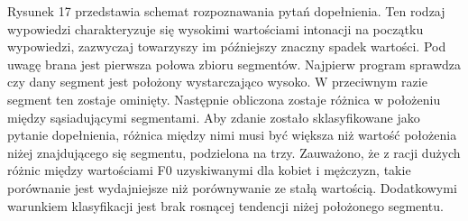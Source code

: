 \documentclass[a4paper,12 pt]{report}
\begin{document}
\FloatBarrier
Rysunek 17 przedstawia schemat rozpoznawania pytań dopełnienia. Ten rodzaj wypowiedzi charakteryzuje się wysokimi wartościami intonacji na początku wypowiedzi, zazwyczaj towarzyszy im późniejszy znaczny spadek wartości.
Pod uwagę brana jest pierwsza połowa zbioru segmentów. Najpierw program sprawdza czy dany segment jest położony wystarczająco wysoko. W przeciwnym razie segment ten zostaje ominięty. Następnie obliczona zostaje różnica w położeniu między sąsiadującymi segmentami.
Aby zdanie zostało sklasyfikowane jako pytanie dopełnienia, różnica między nimi musi być większa niż wartość położenia niżej znajdującego się segmentu, podzielona na trzy. Zauważono, że z racji dużych różnic między wartościami F0 uzyskiwanymi dla kobiet i mężczyzn, takie porównanie jest wydajniejsze niż porównywanie ze stałą wartością. Dodatkowymi warunkiem klasyfikacji jest brak rosnącej tendencji niżej położonego segmentu.
\end{document}
